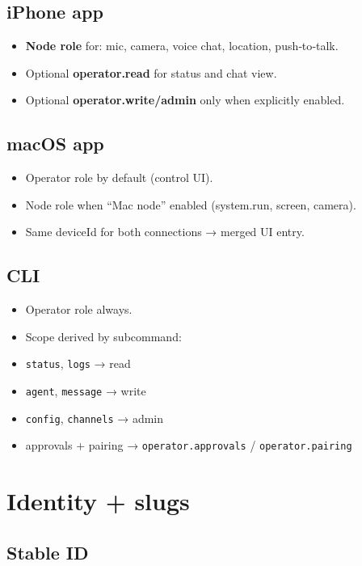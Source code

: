 \subsection{iPhone app}


\begin{itemize}
  \item \textbf{Node role} for: mic, camera, voice chat, location, push‑to‑talk.
  \item Optional \textbf{operator.read} for status and chat view.
  \item Optional \textbf{operator.write/admin} only when explicitly enabled.
\end{itemize}


\subsection{macOS app}


\begin{itemize}
  \item Operator role by default (control UI).
  \item Node role when “Mac node” enabled (system.run, screen, camera).
  \item Same deviceId for both connections → merged UI entry.
\end{itemize}


\subsection{CLI}


\begin{itemize}
  \item Operator role always.
  \item Scope derived by subcommand:
  \item \texttt{status}, \texttt{logs} → read
  \item \texttt{agent}, \texttt{message} → write
  \item \texttt{config}, \texttt{channels} → admin
  \item approvals + pairing → \texttt{operator.approvals} / \texttt{operator.pairing}
\end{itemize}


\hrulefill


\section{Identity + slugs}


\subsection{Stable ID}


